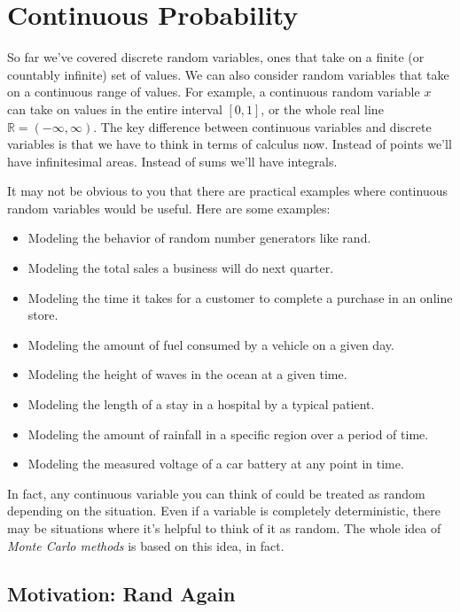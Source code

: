 \documentclass[
  letterpaper,
  DIV=11,
  numbers=noendperiod]{scrreprt}
\providecommand{\tightlist}{%
  \setlength{\itemsep}{0pt}\setlength{\parskip}{0pt}}\usepackage{longtable,booktabs,array}
\begin{document}
\hypertarget{continuous-probability}{%
\section{Continuous Probability}\label{continuous-probability}}

So far we've covered discrete random variables, ones that take on a
finite (or countably infinite) set of values. We can also consider
random variables that take on a continuous range of values. For example,
a continuous random variable \(x\) can take on values in the entire
interval \([0,1]\), or the whole real line
\(\mathbb{R} = (-\infty, \infty)\). The key difference between
continuous variables and discrete variables is that we have to think in
terms of calculus now. Instead of points we'll have infinitesimal areas.
Instead of sums we'll have integrals.

It may not be obvious to you that there are practical examples where
continuous random variables would be useful. Here are some examples:

\begin{itemize}
\tightlist
\item
  Modeling the behavior of random number generators like rand.
\item
  Modeling the total sales a business will do next quarter.
\item
  Modeling the time it takes for a customer to complete a purchase in an
  online store.
\item
  Modeling the amount of fuel consumed by a vehicle on a given day.
\item
  Modeling the height of waves in the ocean at a given time.
\item
  Modeling the length of a stay in a hospital by a typical patient.
\item
  Modeling the amount of rainfall in a specific region over a period of
  time.
\item
  Modeling the measured voltage of a car battery at any point in time.
\end{itemize}

In fact, any continuous variable you can think of could be treated as
random depending on the situation. Even if a variable is completely
deterministic, there may be situations where it's helpful to think of it
as random. The whole idea of \emph{Monte Carlo methods} is based on this
idea, in fact.

\hypertarget{motivation-rand-again}{%
\subsection{Motivation: Rand Again}\label{motivation-rand-again}}
\end{document}

